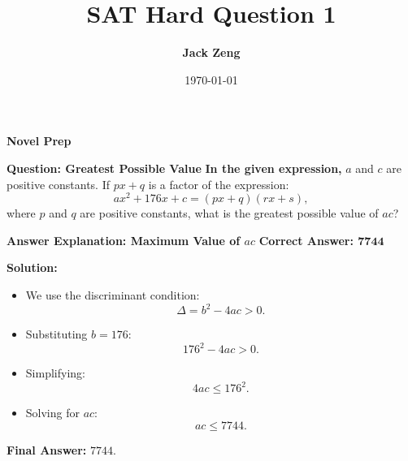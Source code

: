 \documentclass{beamer}
\title[SAT Hard Question]{\textbf{SAT Hard Question 1}}
\author{\textbf{Jack Zeng}}
\institute{\textcolor{white}{\textbf{Novel Prep}}}
\date{\today}
\begin{document}
\begin{frame}
    \titlepage
    \vfill
    \begin{flushright}
        \textcolor{purpleblue}{\Huge \textbf{Novel Prep}}
    \end{flushright}
\end{frame}


\begin{frame}
\end{frame}


\begin{frame}{\textbf{Question: Greatest Possible Value }}
    \textbf{In the given expression,} \( a \) and \( c \) are positive constants.  
    If \( px + q \) is a factor of the expression:
    \[
    ax^2 + 176x + c = (px + q)(rx + s),
    \]
    where \( p \) and \( q \) are positive constants, what is the greatest possible value of \( ac \)?

    \vspace{0.5cm}
\end{frame}

\begin{frame}{\textbf{Answer Explanation: Maximum Value of \( ac \)}}
    \textbf{Correct Answer: \textcolor{novelPurple}{\( \mathbf{7744} \)}}  

    \vspace{0.3cm}
    \textbf{Solution:}
    \begin{itemize}
        \item We use the discriminant condition:
        \[
        \Delta = b^2 - 4ac > 0.
        \]
        \item Substituting \( b = 176 \):
        \[
        176^2 - 4ac > 0.
        \]
        \item Simplifying:
        \[
        4ac \leq 176^2.
        \]
        \item Solving for \( ac \):
        \[
        ac \leq 7744.
        \]
    \end{itemize}
    \textbf{Final Answer:} \( \boxed{7744} \).
\end{frame}
\end{document}
